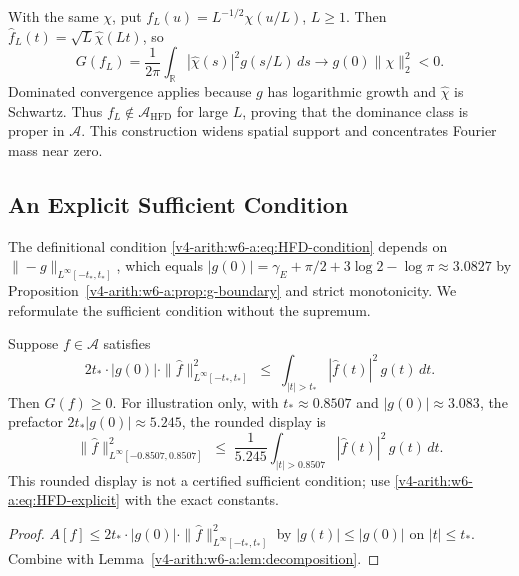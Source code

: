 \begin{remark}
\label{v4-arith:w6-a:rem:HFD-strict}
With the same \(\chi\), put \(f_L(u)=L^{-1/2}\chi(u/L)\),
\(L\geq1\). Then \(\widehat f_L(t)=\sqrt L\widehat\chi(Lt)\), so
\[
 G(f_L)=\frac1{2\pi}\int_{\mathbb R}|\widehat\chi(s)|^2g(s/L)\,ds
 \longrightarrow g(0)\|\chi\|_2^2<0.
\]
Dominated convergence applies because \(g\) has logarithmic growth
and \(\widehat\chi\) is Schwartz. Thus \(f_L\notin\mathscr A_{\mathrm{HFD}}\)
for large \(L\), proving that the dominance class is proper in
\(\mathscr A\). This construction widens spatial support and
concentrates Fourier mass near zero.
\end{remark}

\subsection{An Explicit Sufficient Condition}
\label{v4-arith:w6-a:HFD-subclass:explicit}

The definitional condition \eqref{v4-arith:w6-a:eq:HFD-condition}
depends on \(\|{-}g\|_{L^{\infty}[-t_{\ast},t_{\ast}]}\), which equals
\(|g(0)|=\gamma_{E}+\pi/2+3\log 2-\log\pi\approx 3.0827\) by
Proposition~\ref{v4-arith:w6-a:prop:g-boundary} and strict monotonicity. We
reformulate the sufficient condition without the supremum.

\begin{corollary}
\label{v4-arith:w6-a:cor:HFD-explicit}
Suppose \(f\in\mathscr A\)
satisfies
\begin{equation}
\label{v4-arith:w6-a:eq:HFD-explicit}
2t_{\ast}\cdot|g(0)|\cdot\|\widehat{f}\|_{L^{\infty}[-t_{\ast},t_{\ast}]}^{2}
\;\leq\;
\int_{|t|>t_{\ast}}|\widehat{f}(t)|^{2}\,g(t)\,dt.
\end{equation}
Then \(G(f)\geq 0\). For illustration only, with
\(t_{\ast}\approx 0.8507\) and \(|g(0)|\approx 3.083\), the prefactor
\(2t_{\ast}|g(0)|\approx 5.245\), the rounded display is
\begin{equation}
\label{v4-arith:w6-a:eq:HFD-explicit-numerical}
\|\widehat{f}\|_{L^{\infty}[-0.8507,0.8507]}^{2}\;\leq\;\frac{1}{5.245}\int_{|t|>0.8507}|\widehat{f}(t)|^{2}\,g(t)\,dt.
\end{equation}
This rounded display is not a certified sufficient condition; use
\eqref{v4-arith:w6-a:eq:HFD-explicit} with the exact constants.
\end{corollary}

\begin{proof}
\(A[f]\leq 2t_{\ast}\cdot|g(0)|\cdot\|\widehat{f}\|_{L^{\infty}[-t_{\ast},t_{\ast}]}^{2}\)
by \(|g(t)|\leq|g(0)|\) on \(|t|\leq t_{\ast}\). Combine with
Lemma~\ref{v4-arith:w6-a:lem:decomposition}.
\end{proof}

